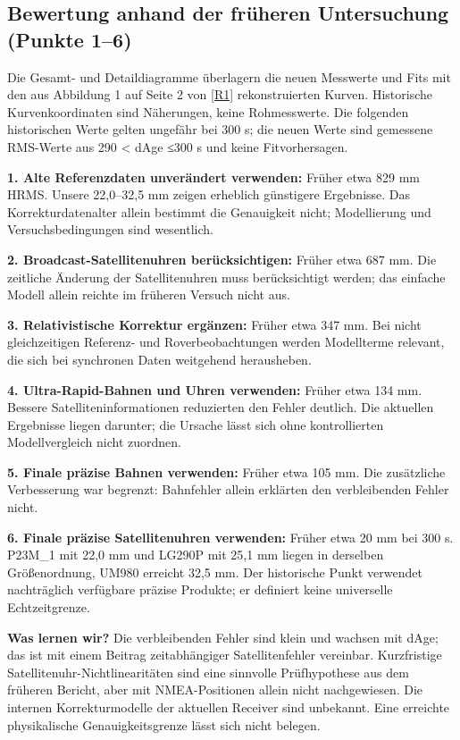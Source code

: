 \documentclass[11pt,a4paper]{article}
\numberwithin{equation}{section}
\numberwithin{figure}{section}
\begin{document}
\subsection{Bewertung anhand der früheren Untersuchung (Punkte 1–6)}

Die Gesamt- und Detaildiagramme überlagern die neuen Messwerte und Fits mit den aus Abbildung 1 auf Seite 2 von \hyperlink{ref-R1}{[R1]} rekonstruierten Kurven. Historische Kurvenkoordinaten sind Näherungen, keine Rohmesswerte. Die folgenden historischen Werte gelten ungefähr bei 300 s; die neuen Werte sind gemessene RMS-Werte aus 290 < dAge ≤300 s und keine Fitvorhersagen.

\textbf{1. Alte Referenzdaten unverändert verwenden:} Früher etwa 829 mm HRMS. Unsere 22,0–32,5 mm zeigen erheblich günstigere Ergebnisse. Das Korrekturdatenalter allein bestimmt die Genauigkeit nicht; Modellierung und Versuchsbedingungen sind wesentlich.

\textbf{2. Broadcast-Satellitenuhren berücksichtigen:} Früher etwa 687 mm. Die zeitliche Änderung der Satellitenuhren muss berücksichtigt werden; das einfache Modell allein reichte im früheren Versuch nicht aus.

\textbf{3. Relativistische Korrektur ergänzen:} Früher etwa 347 mm. Bei nicht gleichzeitigen Referenz- und Roverbeobachtungen werden Modellterme relevant, die sich bei synchronen Daten weitgehend herausheben.

\textbf{4. Ultra-Rapid-Bahnen und Uhren verwenden:} Früher etwa 134 mm. Bessere Satelliteninformationen reduzierten den Fehler deutlich. Die aktuellen Ergebnisse liegen darunter; die Ursache lässt sich ohne kontrollierten Modellvergleich nicht zuordnen.

\textbf{5. Finale präzise Bahnen verwenden:} Früher etwa 105 mm. Die zusätzliche Verbesserung war begrenzt: Bahnfehler allein erklärten den verbleibenden Fehler nicht.

\textbf{6. Finale präzise Satellitenuhren verwenden:} Früher etwa 20 mm bei 300 s. P23M\_1 mit 22,0 mm und LG290P mit 25,1 mm liegen in derselben Größenordnung, UM980 erreicht 32,5 mm. Der historische Punkt verwendet nachträglich verfügbare präzise Produkte; er definiert keine universelle Echtzeitgrenze.

\textbf{Was lernen wir?} Die verbleibenden Fehler sind klein und wachsen mit dAge; das ist mit einem Beitrag zeitabhängiger Satellitenfehler vereinbar. Kurzfristige Satellitenuhr-Nichtlinearitäten sind eine sinnvolle Prüfhypothese aus dem früheren Bericht, aber mit NMEA-Positionen allein nicht nachgewiesen. Die internen Korrekturmodelle der aktuellen Receiver sind unbekannt. Eine erreichte physikalische Genauigkeitsgrenze lässt sich nicht belegen.
\end{document}
